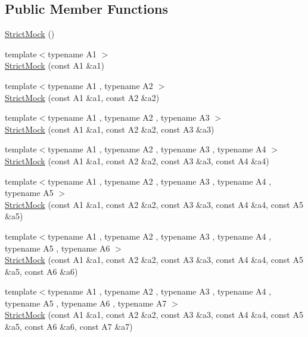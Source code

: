 \subsection*{Public Member Functions}
\begin{DoxyCompactItemize}
\item 
\hyperlink{classtesting_1_1StrictMock_ad609d745db75306dd3b360b5410923fe}{Strict\+Mock} ()
\item 
{\footnotesize template$<$typename A1 $>$ }\\\hyperlink{classtesting_1_1StrictMock_a42db27ba0af29804db8589676817aff8}{Strict\+Mock} (const A1 \&a1)
\item 
{\footnotesize template$<$typename A1 , typename A2 $>$ }\\\hyperlink{classtesting_1_1StrictMock_a345933f3f1a10de381a508f93e680c6b}{Strict\+Mock} (const A1 \&a1, const A2 \&a2)
\item 
{\footnotesize template$<$typename A1 , typename A2 , typename A3 $>$ }\\\hyperlink{classtesting_1_1StrictMock_acc25729cd85a3a412106863894a30fe7}{Strict\+Mock} (const A1 \&a1, const A2 \&a2, const A3 \&a3)
\item 
{\footnotesize template$<$typename A1 , typename A2 , typename A3 , typename A4 $>$ }\\\hyperlink{classtesting_1_1StrictMock_a6b42ef1460901ea91a2a09f44ae8fba2}{Strict\+Mock} (const A1 \&a1, const A2 \&a2, const A3 \&a3, const A4 \&a4)
\item 
{\footnotesize template$<$typename A1 , typename A2 , typename A3 , typename A4 , typename A5 $>$ }\\\hyperlink{classtesting_1_1StrictMock_a2019f4e86224b2adbb9e9326bc175c50}{Strict\+Mock} (const A1 \&a1, const A2 \&a2, const A3 \&a3, const A4 \&a4, const A5 \&a5)
\item 
{\footnotesize template$<$typename A1 , typename A2 , typename A3 , typename A4 , typename A5 , typename A6 $>$ }\\\hyperlink{classtesting_1_1StrictMock_a17b452e1e2f57d7d10f7209587376eef}{Strict\+Mock} (const A1 \&a1, const A2 \&a2, const A3 \&a3, const A4 \&a4, const A5 \&a5, const A6 \&a6)
\item 
{\footnotesize template$<$typename A1 , typename A2 , typename A3 , typename A4 , typename A5 , typename A6 , typename A7 $>$ }\\\hyperlink{classtesting_1_1StrictMock_a4af48752fc22815250369292b9c064bc}{Strict\+Mock} (const A1 \&a1, const A2 \&a2, const A3 \&a3, const A4 \&a4, const A5 \&a5, const A6 \&a6, const A7 \&a7)

\end{DoxyCompactItemize}
